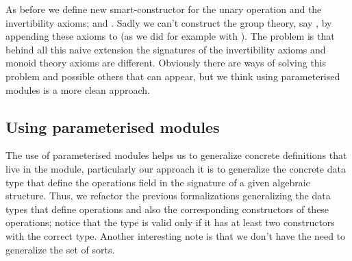As before we define new smart-constructor for the unary operation and the
invertibility axioms; \AgdaSpace{}%
\AgdaSymbol{=}\AgdaSpace{}%
\AgdaSpace{}%
\AgdaSymbol{(}\AgdaSpace{}%
\AgdaSpace{}%
\AgdaSymbol{(}\AgdaSpace{}%
\AgdaSymbol{))}\AgdaSpace{}%
\AgdaSpace{}%
 and
\AgdaSpace{}%
\AgdaSymbol{=}\AgdaSpace{}%
\AgdaSpace{}%
\AgdaSymbol{((}\AgdaSpace{}%
\AgdaSymbol{)}\AgdaSpace{}%
\AgdaSpace{}%
\AgdaSymbol{)}\AgdaSpace{}%
\AgdaSpace{}%
. Sadly we can't construct the group theory, say
, by appending these axioms to 
(as we did for example with ). The problem is that
behind all this naive extension the signatures of the invertibility axioms and
monoid theory axioms are different. Obviously there are ways of solving this
problem and possible others that can appear, but we think using parameterised
modules is a more clean approach.

\subsection{Using parameterised modules}

The use of parameterised modules helps us to generalize concrete definitions
that live in the module, particularly our approach it is to generalize the
concrete data type that define the operations field in the signature of a given
algebraic structure. Thus, we refactor the previous formalizations generalizing
the data types that define operations and also the corresponding constructors of
these operations; notice that the type  is valid only if
it has at least two constructors with the correct type. Another interesting note
is that we don't have the need to generalize the set of sorts.


